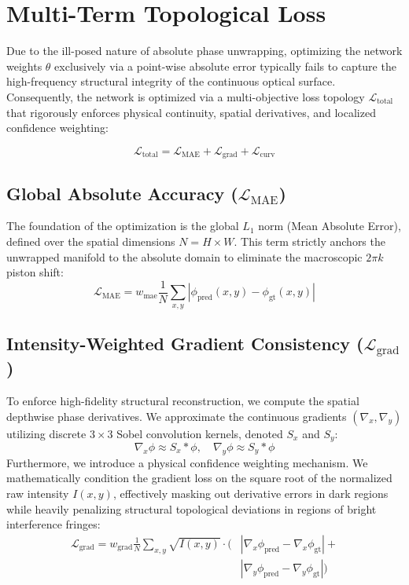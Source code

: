 \documentclass[11pt,onecolumn]{IEEEtran}
\begin{document}
\section{Multi-Term Topological Loss}
Due to the ill-posed nature of absolute phase unwrapping, optimizing the network weights $\theta$ exclusively via a point-wise absolute error typically fails to capture the high-frequency structural integrity of the continuous optical surface. Consequently, the network is optimized via a multi-objective loss topology $\mathcal{L}_{\text{total}}$ that rigorously enforces physical continuity, spatial derivatives, and localized confidence weighting:

\begin{equation}
  \mathcal{L}_{\text{total}} = \mathcal{L}_{\text{MAE}} + \mathcal{L}_{\text{grad}} + \mathcal{L}_{\text{curv}}
\end{equation}

\subsection{Global Absolute Accuracy ($\mathcal{L}_{\text{MAE}}$)}
The foundation of the optimization is the global $L_1$ norm (Mean Absolute Error), defined over the spatial dimensions $N = H \times W$. This term strictly anchors the unwrapped manifold to the absolute domain to eliminate the macroscopic $2\pi k$ piston shift:
\begin{equation}
  \mathcal{L}_{\text{MAE}} = w_{\text{mae}} \frac{1}{N} \sum_{x,y} \left| \phi_{\text{pred}}(x,y) - \phi_{\text{gt}}(x,y) \right|
\end{equation}

\subsection{Intensity-Weighted Gradient Consistency ($\mathcal{L}_{\text{grad}}$)}
To enforce high-fidelity structural reconstruction, we compute the spatial depthwise phase derivatives. We approximate the continuous gradients $(\nabla_x, \nabla_y)$ utilizing discrete $3 \times 3$ Sobel convolution kernels, denoted $S_x$ and $S_y$:
\begin{equation}
  \nabla_x \phi \approx S_x \ast \phi, \quad \nabla_y \phi \approx S_y \ast \phi
\end{equation}
Furthermore, we introduce a physical confidence weighting mechanism. We mathematically condition the gradient loss on the square root of the normalized raw intensity $I(x,y)$, effectively masking out derivative errors in dark regions while heavily penalizing structural topological deviations in regions of bright interference fringes:
\begin{align}
  \mathcal{L}_{\text{grad}} = w_{\text{grad}} \frac{1}{N} \sum_{x,y} \sqrt{I(x,y)} \cdot \Big(
    &\left| \nabla_x\phi_{\text{pred}} - \nabla_x\phi_{\text{gt}} \right| + \nonumber \\
  &\left| \nabla_y\phi_{\text{pred}} - \nabla_y\phi_{\text{gt}} \right| \Big)
\end{align}
\end{document}
